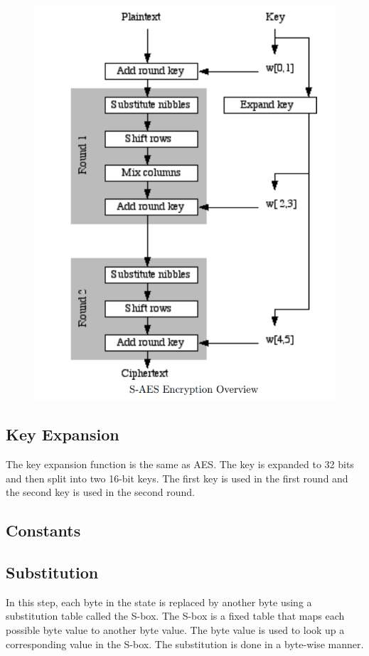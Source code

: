\documentclass[11pt]{article}
\begin{document}
\begin{figure}[H]
	\centering
	\includegraphics[scale=0.5]{saes.png}
	\caption{}
\end{figure}

\subsection{Key Expansion}
The key expansion function is the same as AES. The key is expanded to 32 bits and
then split into two 16-bit keys. The first key is used in the first round and the second key is used in the second round. 
\subsection{Constants}

\subsection{Substitution}
In this step, each byte in the state is replaced by another byte using a substitution table called the S-box. The S-box is a fixed table that maps each possible byte value to another byte value. The byte value is used to look up a corresponding value in the S-box. The substitution is done in a byte-wise manner.
\end{document}
